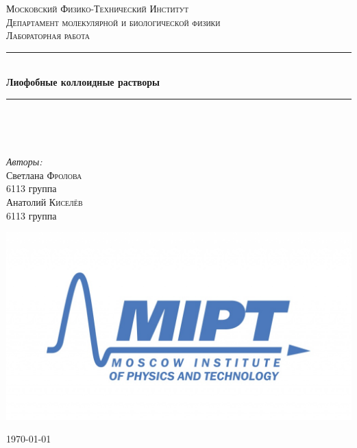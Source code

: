 \documentclass[a4paper, 12pt]{article}
\newenvironment{bottompar}{\par\vspace*{\fill}}{\clearpage}
\begin{document}
\begin{titlepage}

\newcommand{\HRule}{\rule{\linewidth}{0.5mm}} %

\center %
 

\textsc{\LARGE Московский Физико-Технический Институт}\\[1,5cm] %
\textsc{\Large Департамент молекулярной и биологической физики}\\[2cm] %
\textsc{\large Лабораторная работа}\\[0.5cm] %


\HRule
\\[0.4cm]
{ \huge \bfseries Лиофобные коллоидные растворы}
\\[0.2cm] %
\HRule
\\[1.5cm]


 
\begin{minipage}{0.4\textwidth}
	\begin{flushleft}		
	\end{flushleft}
\end{minipage}
~
\begin{minipage}{0.4\textwidth}
	\begin{flushright} \large
		\emph{Авторы:}\\
		Светлана \textsc{Фролова} \\
		6113 группа \\
		Анатолий \textsc{Киселёв} \\
		6113 группа
	\end{flushright}
\end{minipage}


\begin{bottompar}
	\begin{center}
		\includegraphics[width = 80 mm]{logo.jpg}
	\end{center}
	{\large \today}


\end{bottompar}
\end{titlepage}
\end{document}
